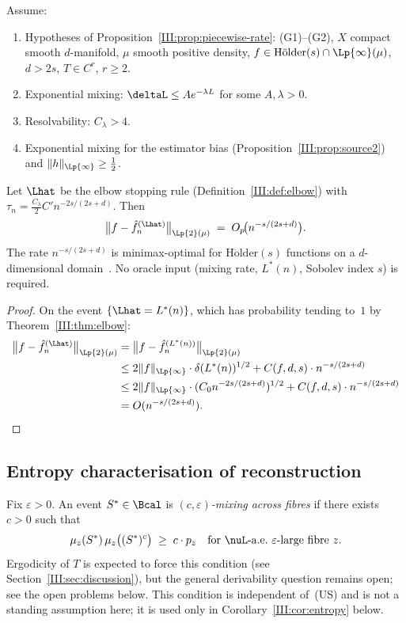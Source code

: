 \begin{theorem}
\label{III:thm:algebra}
Assume:
\begin{enumerate}[label=(\roman*)]
  \item Hypotheses of Proposition~\ref{III:prop:piecewise-rate}:
    (G1)--(G2), $X$ compact smooth $d$-manifold, $\mu$ smooth positive density,
    $f \in \mathrm{H\ddot{o}lder}(s) \cap \Lp{\infty}(\mu)$, $d > 2s$, $T \in C^r$, $r \geq 2$.
  \item Exponential mixing: $\deltaL \leq A e^{-\lambda L}$ for some $A, \lambda > 0$.
  \item Resolvability: $C_\lambda > 4$.
  \item Exponential mixing for the estimator bias (Proposition~\ref{III:prop:source2})
    and $\|h\|_{\Lp{\infty}} \geq \frac{1}{2}$.
\end{enumerate}
Let $\Lhat$ be the elbow stopping rule (Definition~\ref{III:def:elbow}) with
$\tau_n = \frac{C_\lambda}{2} C' n^{-2s/(2s+d)}$.
Then
\[
  \bigl\|f - \hat{f}_n^{(\Lhat)}\bigr\|_{\Lp{2}(\mu)}
  \;=\; O_p\!\bigl(n^{-s/(2s+d)}\bigr).
\]
The rate $n^{-s/(2s+d)}$ is minimax-optimal for $\mathrm{H\ddot{o}lder}(s)$
functions on a $d$-dimensional domain~\cite{Stone1982}.
No oracle input (mixing rate, $L^*(n)$, Sobolev index $s$) is required.
\end{theorem}

\begin{proof}
On the event $\{\Lhat = L^*(n)\}$, which has probability tending to~$1$ by
Theorem~\ref{III:thm:elbow}:
\begin{align*}
  \bigl\|f - \hat{f}_n^{(\Lhat)}\bigr\|_{\Lp{2}(\mu)}
  &= \bigl\|f - \hat{f}_n^{(L^*(n))}\bigr\|_{\Lp{2}(\mu)} \\
  &\leq 2\|f\|_{\Lp{\infty}} \cdot \delta(L^*(n))^{1/2}
    + C(f,d,s) \cdot n^{-s/(2s+d)} \\
  &\leq 2\|f\|_{\Lp{\infty}} \cdot (C_0 n^{-2s/(2s+d)})^{1/2}
    + C(f,d,s) \cdot n^{-s/(2s+d)} \\
  &= O(n^{-s/(2s+d)}). \qedhere
\end{align*}
\end{proof}

\subsection{Entropy characterisation of reconstruction}
\label{III:subsec:entropy}

\begin{definition}
\label{III:def:fibre-mixing}
Fix $\varepsilon > 0$.
An event $S^* \in \Bcal$ is \emph{$(c,\varepsilon)$-mixing across fibres} if
there exists $c > 0$ such that
\[
  \mu_z(S^*)\,\mu_z\bigl((S^*)^c\bigr) \;\geq\; c\cdot p_z
  \quad\text{for $\nuL$-a.e.\ $\varepsilon$-large fibre } z.
\]
Ergodicity of $T$ is expected to force this condition (see
Section~\ref{III:sec:discussion}), but the general derivability question remains
open; see the open problems below.
This condition is independent of~(US) and is not a standing assumption here;
it is used only in Corollary~\ref{III:cor:entropy} below.
\end{definition}

